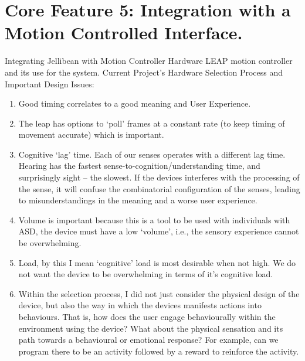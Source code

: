 \documentclass[a4paper, 11pt]{article}
\begin{document}
\section{Core Feature 5: Integration with a Motion Controlled Interface.}
Integrating Jellibean with Motion Controller Hardware
LEAP motion controller and its use for the system.
Current Project’s Hardware Selection Process and Important Design Issues:
\begin{enumerate}
\item{Good timing correlates to a good meaning and User Experience.}
\item{The leap has options to ‘poll’ frames at a constant rate (to keep timing of movement accurate) which is important.}
\item{Cognitive ‘lag’ time. Each of our senses operates with a different lag time. Hearing has the fastest sense-to-cognition/understanding time, and surprisingly sight -- the slowest. If the devices interferes with the processing of the sense, it will confuse the combinatorial configuration of the senses, leading to misunderstandings in the meaning and a worse user experience.}
\item{Volume is important because this is a tool to be used with individuals with ASD, the device must have a low `volume’, i.e., the sensory experience cannot be overwhelming.}
\item{Load, by this I mean `cognitive' load is most desirable when not high. We do not want the device to be overwhelming in terms of it’s cognitive load.}
\item{Within the selection process, I did not just consider the physical design of the device, but also the way in which the devices manifests actions into behaviours. That is, how does the user engage behaviourally within the environment using the device? What about the physical sensation and its path towards a behavioural or emotional response? For example, can we program there to be an activity followed by a reward to reinforce the activity.}
\end{enumerate}
\end{document}
